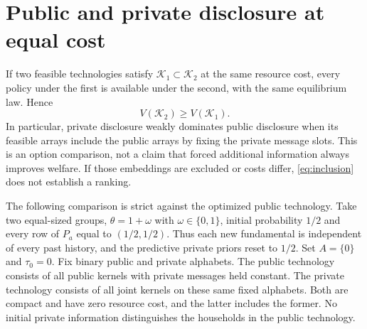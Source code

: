 \documentclass[11pt,a4paper]{article}
\newcommand{\cK}{\mathcal K}
\begin{document}
\section{Public and private disclosure at equal cost}
If two feasible technologies satisfy $\cK_1\subset\cK_2$ at the same
resource cost, every policy under the first is available under the second,
with the same equilibrium law. Hence
\begin{equation}\label{eq:inclusion}
 V(\cK_2)\geq V(\cK_1).
\end{equation}
In particular, private disclosure weakly dominates public disclosure when its
feasible arrays include the public arrays by fixing the private message slots.
This is an option comparison, not a claim that forced additional information
always improves welfare. If those embeddings are excluded or costs differ,
\eqref{eq:inclusion} does not establish a ranking.

The following comparison is strict against the optimized public technology.
Take two equal-sized groups, $\theta=1+\omega$ with
$\omega\in\{0,1\}$, initial probability $1/2$ and every row of $P_a$ equal
to $(1/2,1/2)$. Thus each new fundamental is independent of every past history,
and the predictive private priors reset to $1/2$. Set $A=\{0\}$ and $\tau_0=0$.
Fix binary public and private alphabets. The public technology consists of all
public kernels with private messages held constant. The private technology
consists of all joint kernels on these same fixed alphabets. Both are compact
and have zero resource cost, and the latter includes the former. No initial
private information distinguishes the households in the public technology.
\end{document}

